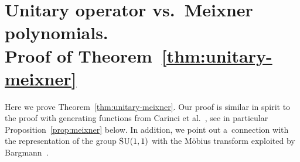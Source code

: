 \documentclass[pdftex]{sigma}
\numberwithin{equation}{section}
\newcommand{\1}{\mathbbm{1}}
\begin{document}
\section[Unitary operator vs.\ Meixner polynomials. Proof of Theorem~\ref{thm:unitary-meixner}]{Unitary operator vs.\ Meixner polynomials.\\ Proof of Theorem~\ref{thm:unitary-meixner}}
\label{sec:generating}

Here we prove Theorem~\ref{thm:unitary-meixner}. Our proof is similar in spirit to the proof with generating functions from Carinci et al.~\cite{carinci2019orthogonal}, see in particular Proposition~\ref{prop:meixner} below. In addition, we point out a~connection with the representation of the group ${\rm SU}(1,1)$ with the M{\"o}bius transform exploited by Bargmann~\cite[Section 9]{bargmann1947}.
\end{document}
